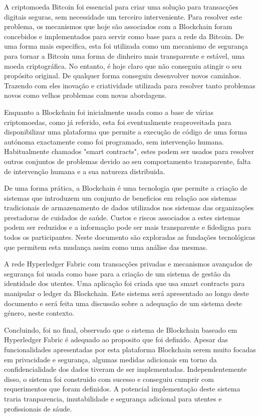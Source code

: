 \begin{tueSUMARIO}

  A criptomoeda Bitcoin foi essencial para criar uma solução para transacções
  digitais seguras, sem necessidade um terceiro interveniente. Para resolver
  este problema, os mecanismos que hoje são associados com a Blockchain foram
  concebidos e implementados para servir como base para a rede da Bitcoin. De
  uma forma mais especifica, esta foi utilizada como um mecanismo de segurança
  para tornar a Bitcoin uma forma de dinheiro mais transparente e estável, uma
  moeda criptográfica. No entanto, é hoje claro que não conseguiu atingir o seu
  propósito original. De qualquer forma conseguiu desenvolver novos caminhos.
  Trazendo com eles inovação e criatividade utilizada para resolver tanto
  problemas novos como velhos problemas com novas abordagens.

  Enquanto a Blockchain foi inicialmente usada como a base de várias
  criptomoedas, como já referido, esta foi eventualmente reaproveitada para
  disponibilizar uma plataforma que permite a execução de código de uma forma
  autónoma exactamente como foi programado, sem intervenção humana.
  Habitualmente chamados "smart contracts", estes podem ser usados para
  resolver outros conjuntos de problemas devido ao seu comportamento
  transparente, falta de intervenção humana e a sua natureza distribuida. 

  De uma forma prática, a Blockchain é uma tecnologia que permite a criação de
  sistemas que introduzem um conjunto de beneficios em relação aos sistemas
  tradicionais de armazenamento de dados utilizados nos sistemas das
  organizações prestadoras de cuidados de saúde. Custos e riscos associados a
  estes sistemas podem ser reduzidos e a informação pode ser mais transparente
  e fidedigna para todos os participantes. Neste documento são exploradas as
  fundações tecnológicas que permitem esta mudança assim como uma análise das
  mesmas.

  A rede Hyperledger Fabric com transacções privadas e mecanismos avançados de
  segurança foi usada como base para a criação de um sistema de gestão da
  identidade dos utentes. Uma aplicação foi criada que usa smart contracts para
  manipular o ledger da Blockchain. Este sistema será apresentado ao longo
  deste documento e será feita uma discussão sobre a adequação de um sistema
  deste género, neste contexto.

  Concluindo, foi no final, observado que o sistema de Blockchain baseado em
  Hyperledger Fabric é adequado ao proposito que foi definido. Apesar das
  funcionalidades apresentadas por esta plataforma Blockchain serem muito
  focadas em privacidade e segurança, algumas medidas adicionais em torno da
  confidencialidade dos dados tiveram de ser implementadas. Independentemente
  disso, o sistema foi construido com sucesso e conseguiu cumprir com
  requerimentos que foram definidos. A potencial implementação deste sistema
  traria tranparencia, imutabilidade e segurança adicional para utentes e
  profissionais de sáude.

\end{tueSUMARIO}
